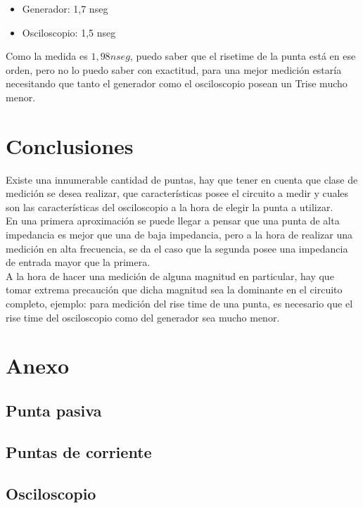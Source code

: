 \documentclass[a4paper,10pt]{article}
\begin{document}
		\begin{itemize}
			\item Generador: 1,7 nseg
			\item Osciloscopio: 1,5 nseg
		\end{itemize}
		\indent Como la medida es $1,98 nseg$, puedo saber que el risetime de
		la punta está en ese orden, pero no lo puedo saber con exactitud, para
		una mejor medición estaría necesitando que tanto el generador como el
		osciloscopio posean un Trise mucho menor.

	\newpage
	\section{Conclusiones}
	\indent Existe una innumerable cantidad de puntas, hay que tener en cuenta
	que clase de medición se desea realizar, que características posee el 
	circuito a medir y cuales son las características del osciloscopio a la 
	hora de elegir la punta a utilizar. \\
	\indent En una primera aproximación se puede llegar a pensar que una punta
	de alta impedancia es mejor que una de baja impedancia, pero a la hora de
	realizar una medición en alta frecuencia, se da el caso que la segunda 
	posee una impedancia de entrada mayor que la primera.\\
	\indent A la hora de hacer una medición de alguna magnitud en particular,
	hay que tomar extrema precaución que dicha magnitud sea la dominante en el
	circuito completo, ejemplo: para medición del rise time de una punta, es 
	necesario que el rise time del osciloscopio como del generador sea mucho 
	menor. 
	
	\newpage
	\section{Anexo}
	\subsection{Punta pasiva}
	

	\newpage
	\subsection{Puntas de corriente}
	
	
	
	\newpage
	\subsection{Osciloscopio}
	
\end{document}
